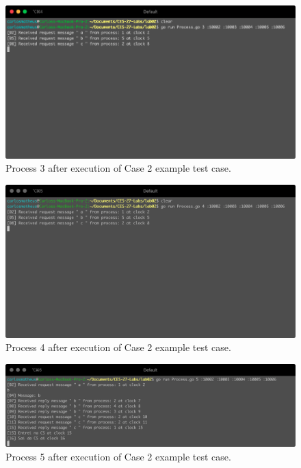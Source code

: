 \documentclass[a4paper, 11pt]{article}
\begin{document}
\begin{figure}[h]
  \begin{center}
  \includegraphics[width=4.5in]{./imgs/case2process3.png}
  \caption{Process 3 after execution of Case 2 example test case.}
  \label{img_task2_example_window3}
  \end{center}
\end{figure}

\begin{figure}[h]
  \begin{center}
  \includegraphics[width=4.5in]{./imgs/case2process4.png}
  \caption{Process 4 after execution of Case 2 example test case.}
  \label{img_task2_example_window4}
  \end{center}
\end{figure}

\begin{figure}[h]
  \begin{center}
  \includegraphics[width=4.5in]{./imgs/case2process5.png}
  \caption{Process 5 after execution of Case 2 example test case.}
  \label{img_task2_example_window5}
  \end{center}
\end{figure}
\end{document}
